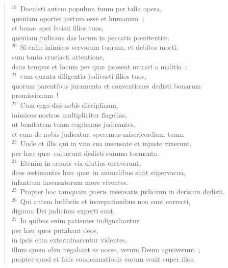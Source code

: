 \begin{flushleft}\begin{verse}${}^{19}$~Docuisti autem populum tuum per talia opera,\\ quoniam oportet justum esse et humanum~;\\ et bon\ae\ spei fecisti filios tuos,\\ quoniam judicans das locum in peccatis pœnitenti\ae .\\
${}^{20}$~Si enim inimicos servorum tuorum, et debitos morti,\\ cum tanta cruciasti attentione,\\ dans tempus et locum per qu\ae\ possent mutari a malitia~:\\
${}^{21}$~cum quanta diligentia judicasti filios tuos,\\ quorum parentibus juramenta et conventiones dedisti bonarum promissionum~!\\
${}^{22}$~Cum ergo das nobis disciplinam,\\ inimicos nostros multipliciter flagellas,\\ ut bonitatem tuam cogitemus judicantes,\\ et cum de nobis judicatur, speremus misericordiam tuam.\\
${}^{23}$~Unde et illis qui in vita sua insensate et injuste vixerunt,\\ per h\ae c qu\ae\ coluerunt dedisti summa tormenta.\\
${}^{24}$~Etenim in erroris via diutius erraverunt,\\ deos \ae stimantes h\ae c qu\ae\ in animalibus sunt supervacua,\\ infantium insensatorum more viventes.\\
${}^{25}$~Propter hoc tamquam pueris insensatis judicium in derisum dedisti.\\
${}^{26}$~Qui autem ludibriis et increpationibus non sunt correcti,\\ dignum Dei judicium experti sunt.\\
${}^{27}$~In quibus enim patientes indignabantur\\ per h\ae c quos putabant deos,\\ in ipsis cum exterminarentur videntes,\\ illum quem olim negabant se nosse, verum Deum agnoverunt~;\\ propter quod et finis condemnationis eorum venit super illos.\end{verse}\end{flushleft}


